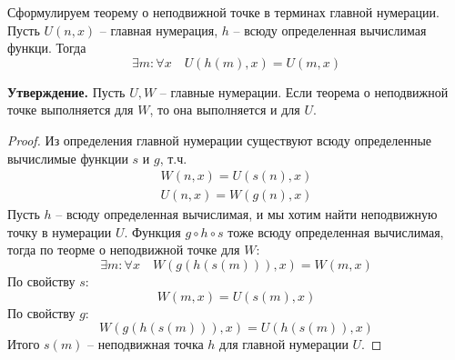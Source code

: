 Сформулируем теорему о неподвижной точке в терминах главной нумерации. Пусть $U(n, x)$ -- главная нумерация, $h$ -- всюду определенная вычислимая функци. Тогда \[ \exists m : \forall x \quad U(h(m), x) = U(m, x) \]

\textbf{Утверждение.} Пусть $U, W$ -- главные нумерации. Если теорема о неподвижной точке выполняется для $W$, то она выполняется и для $U$. 
\begin{proof}
    Из определения главной нумерации существуют всюду определенные вычислимые функции $s$ и $g$, т.ч. \begin{gather*}
        W(n, x) = U(s(n), x) \\
        U(n, x) = W(g(n), x)
    \end{gather*}
    Пусть $h$ -- всюду определенная вычислимая, и мы хотим найти неподвижную точку в нумерации $U$.  Функция $g \circ h \circ s$ тоже всюду определенная вычислимая, тогда по теорме о неподвижной точке для $W$: \[ \exists m : \forall x \quad W(g(h(s(m))), x) = W(m, x) \]
    По свойству $s$: \[ W(m, x) = U(s(m), x) \]
    По свойству $g$: \[ W(g(h(s(m))), x) = U(h(s(m)), x) \]
    Итого $s(m)$ -- неподвижная точка $h$ для главной нумерации $U$.
\end{proof}

